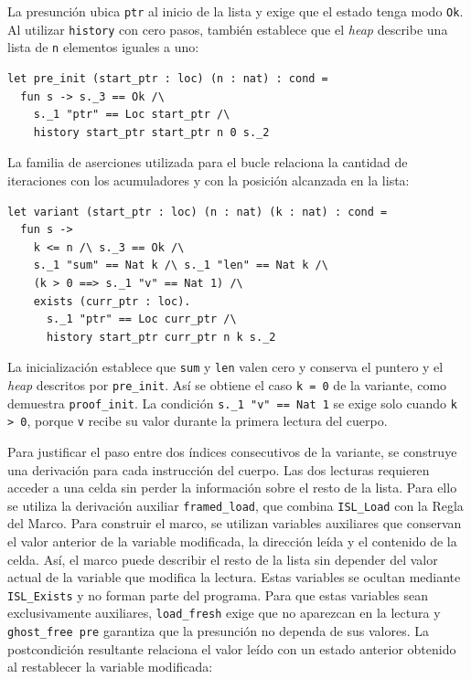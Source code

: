 \documentclass[a4paper,	11pt]{report}
\begin{document}
La presunción ubica \lstinline|ptr| al inicio de la lista y exige que el estado tenga modo \lstinline|Ok|.
Al utilizar \lstinline|history| con cero pasos,
también establece que el \emph{heap} describe una lista de \lstinline|n| elementos iguales a uno:

\begin{lstlisting}
let pre_init (start_ptr : loc) (n : nat) : cond =
  fun s -> s._3 == Ok /\
    s._1 "ptr" == Loc start_ptr /\
    history start_ptr start_ptr n 0 s._2
\end{lstlisting}

La familia de aserciones utilizada para el bucle relaciona la cantidad de iteraciones con los acumuladores
y con la posición alcanzada en la lista:

\begin{lstlisting}
let variant (start_ptr : loc) (n : nat) (k : nat) : cond =
  fun s ->
    k <= n /\ s._3 == Ok /\
    s._1 "sum" == Nat k /\ s._1 "len" == Nat k /\
    (k > 0 ==> s._1 "v" == Nat 1) /\
    exists (curr_ptr : loc).
      s._1 "ptr" == Loc curr_ptr /\
      history start_ptr curr_ptr n k s._2
\end{lstlisting}
La inicialización establece que \lstinline|sum| y \lstinline|len| valen cero y conserva el puntero y el \emph{heap} descritos por \lstinline|pre_init|.
Así se obtiene el caso \lstinline|k = 0| de la variante,
como demuestra \lstinline|proof_init|.
La condición \lstinline|s._1 "v" == Nat 1| se exige solo cuando \lstinline|k > 0|,
porque \lstinline|v| recibe su valor durante la primera lectura del cuerpo.

Para justificar el paso entre dos índices consecutivos de la variante,
se construye una derivación para cada instrucción del cuerpo.
Las dos lecturas requieren acceder a una celda sin perder la información sobre el resto de la lista.
Para ello se utiliza la derivación auxiliar \lstinline|framed_load|,
que combina \lstinline|ISL_Load| con la Regla del Marco.
Para construir el marco,
se utilizan variables auxiliares que conservan el valor anterior de la variable modificada,
la dirección leída y el contenido de la celda.
Así,
el marco puede describir el resto de la lista sin depender del valor actual de la variable que modifica la lectura.
Estas variables se ocultan mediante \lstinline|ISL_Exists| y no forman parte del programa.
Para que estas variables sean exclusivamente auxiliares,
\lstinline|load_fresh| exige que no aparezcan en la lectura y \lstinline|ghost_free pre| garantiza que la presunción no dependa de sus valores.
La postcondición resultante relaciona el valor leído con un estado anterior obtenido al restablecer la variable modificada:
\end{document}
